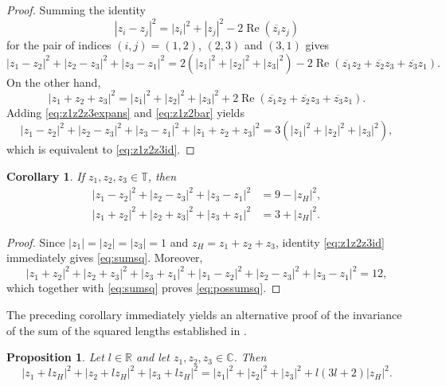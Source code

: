 \documentclass[11pt,reqno]{amsart}
\newtheorem{proposition}{Proposition}[section]
\newtheorem{corollary}{Corollary}[section]
\theoremstyle{definition}
\numberwithin{equation}{section}
\begin{document}
\begin{proof}
Summing the identity
\[
|z_i-z_j|^2
=
|z_i|^2+|z_j|^2
-2\operatorname{Re}(\overline{z_i} z_j)
\]
for the pair of indices $(i,j)=(1,2)$, $(2,3)$ and $(3,1)$ gives
\begin{equation}\label{eq:z1z2z3expans}
|z_1-z_2|^2+|z_2-z_3|^2+|z_3-z_1|^2
=
2(|z_1|^2+|z_2|^2+|z_3|^2)
-
2\operatorname{Re}
\left(
\overline{z_1}z_2+\overline{z_2}z_3+\overline{z_3}z_1
\right).
\end{equation}
On the other hand,
\begin{equation}\label{eq:z1z2bar}
|z_1+z_2+z_3|^2
=
|z_1|^2+|z_2|^2+|z_3|^2
+
2\operatorname{Re}
\left(
\overline{z_1}z_2+\overline{z_2}z_3+\overline{z_3}z_1
\right).
\end{equation}
Adding \eqref{eq:z1z2z3expans} and \eqref{eq:z1z2bar} yields
\[
|z_1-z_2|^2+|z_2-z_3|^2+|z_3-z_1|^2
+
|z_1+z_2+z_3|^2
=
3(|z_1|^2+|z_2|^2+|z_3|^2),
\]
which is equivalent to \eqref{eq:z1z2z3id}.
\end{proof}

\begin{corollary}\label{cor:sumsqdis}
If $z_1,z_2,z_3\in\mathbb T$, then
\begin{align}
|z_1-z_2|^2+|z_2-z_3|^2+|z_3-z_1|^2
&=9-|z_H|^2,\label{eq:sumsq}\\
|z_1+z_2|^2+|z_2+z_3|^2+|z_3+z_1|^2
&=3+|z_H|^2.\label{eq:possumsq}
\end{align}
\end{corollary}

\begin{proof}
Since $|z_1|=|z_2|=|z_3|=1$ and $z_H=z_1+z_2+z_3$, identity \eqref{eq:z1z2z3id} immediately gives \eqref{eq:sumsq}. Moreover,
\[
|z_1+z_2|^2+|z_2+z_3|^2+|z_3+z_1|^2
+
|z_1-z_2|^2+|z_2-z_3|^2+|z_3-z_1|^2
=12,
\]
which together with \eqref{eq:sumsq} proves \eqref{eq:possumsq}.
\end{proof}

The preceding corollary immediately yields an alternative proof of the invariance of the sum of the squared lengths established in \cite[Theorem 3.5]{Dragovic-Murad2026}.

\begin{proposition}\label{prop:abcoh}
Let $l\in\mathbb R$ and let $z_1,z_2,z_3\in\mathbb C$. Then
\begin{equation}\label{eq:zlzh}
|z_1+lz_H|^2+|z_2+lz_H|^2+|z_3+lz_H|^2
=
|z_1|^2+|z_2|^2+|z_3|^2
+l(3l+2)|z_H|^2.
\end{equation}
\end{proposition}
\end{document}
